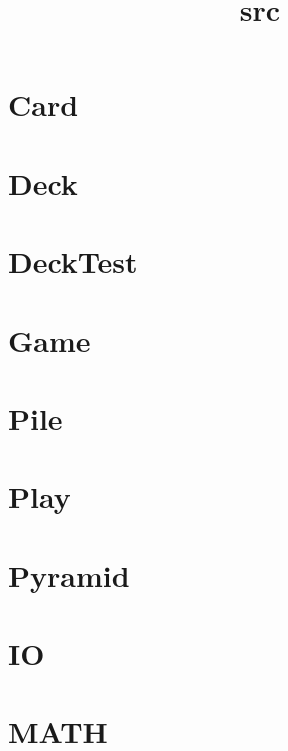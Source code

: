 \documentclass{article}
\begin{document}
\title{src}
\author{}
\maketitle
\tableofcontents

\section{Card}

\section{Deck}

\section{DeckTest}

\section{Game}

\section{Pile}

\section{Play}

\section{Pyramid}

\section{IO}

\section{MATH}

\end{document}
